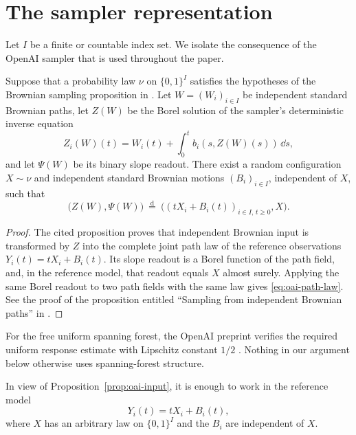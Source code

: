 \section{The sampler representation}

Let $I$ be a finite or countable index set.  We isolate the consequence of the
OpenAI sampler that is used throughout the paper.

\begin{proposition}\label{prop:oai-input}
Suppose that a probability law $\nu$ on $\{0,1\}^I$ satisfies the hypotheses of
the Brownian sampling proposition in \cite[Section~4]{OpenAI2026FUSF}.  Let
$W=(W_i)_{i\in I}$ be independent standard Brownian paths, let $Z(W)$ be the
Borel solution of the sampler's deterministic inverse equation
\begin{equation}\label{eq:inverse-drift}
 Z_i(W)(t)=W_i(t)+\int_0^t b_i(s,Z(W)(s))\,\dd s,
\end{equation}
and let $\Psi(W)$ be its binary slope readout.  There exist a random configuration
$X\sim\nu$ and independent standard Brownian motions $(B_i)_{i\in I}$,
independent of $X$, such that
\begin{equation}\label{eq:oai-path-law}
  \bigl(Z(W),\Psi(W)\bigr)
  \ \stackrel{\mathrm d}{=}\
  \bigl((tX_i+B_i(t))_{i\in I,\,t\ge0},X\bigr).
\end{equation}
\end{proposition}

\begin{proof}
The cited proposition proves that independent Brownian input is transformed by
$Z$ into the complete joint path law of the reference observations
$Y_i(t)=tX_i+B_i(t)$.  Its slope readout is a Borel function of the path field,
and, in the reference model, that readout equals $X$ almost surely.  Applying
the same Borel readout to two path fields with the same law gives
\eqref{eq:oai-path-law}.  See the proof of the proposition entitled
``Sampling from independent Brownian paths'' in
\cite[Section~4]{OpenAI2026FUSF}.
\end{proof}

For the free uniform spanning forest, the OpenAI preprint verifies the required
uniform response estimate with Lipschitz constant $1/2$
\cite[Section~4]{OpenAI2026FUSF}.  Nothing in our argument below otherwise uses
spanning-forest structure.

In view of Proposition~\ref{prop:oai-input}, it is enough to work in the
reference model
\begin{equation}\label{eq:reference-model}
  Y_i(t)=tX_i+B_i(t),
\end{equation}
where $X$ has an arbitrary law on $\{0,1\}^I$ and the $B_i$ are independent of
$X$.

